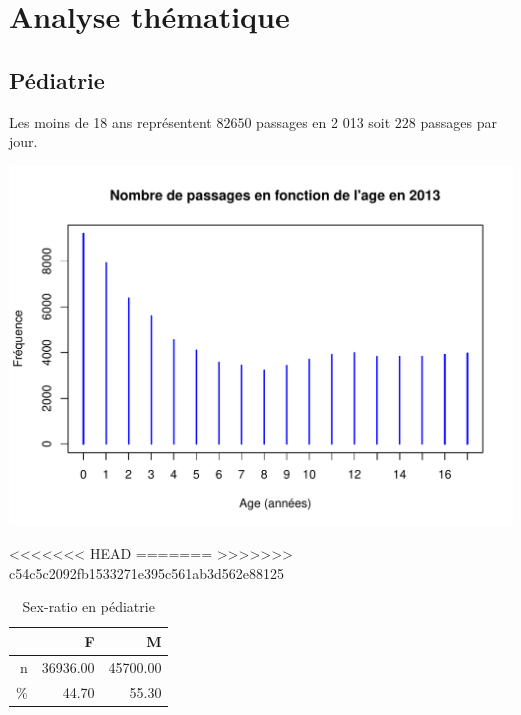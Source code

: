 \documentclass[12pt,english,french,twoside]{book}\usepackage[]{graphicx}\usepackage[]{color}
\makeatletter
\def\maxwidth{ %
  \ifdim\Gin@nat@width>\linewidth
    \linewidth
  \else
    \Gin@nat@width
  \fi
}
\newenvironment{knitrout}{}{} %
\makeatother
\begin{document}


\part{Analyse thématique} 
\newpage

\chapter{Pédiatrie}





Les moins de 18 ans représentent $82 650$ passages en 2 013 soit $228$ passages par jour.


\begin{knitrout}
\color{fgcolor}
\includegraphics[width=\maxwidth]{figure/passages_pediatrie} 

\end{knitrout}



<<<<<<< HEAD
=======
>>>>>>> c54c5c2092fb1533271e395c561ab3d562e88125
\begin{table}[ht]
\centering
\begin{tabular}{rrr}
  \hline
 & F & M \\ 
  \hline
n & 36936.00 & 45700.00 \\ 
  \% & 44.70 & 55.30 \\ 
   \hline
\end{tabular}
\caption[Sex-ratio en pédiatrie]{Sex-ratio en pédiatrie} 
\label{tab:ped_sr}
\end{table}
\end{document}
